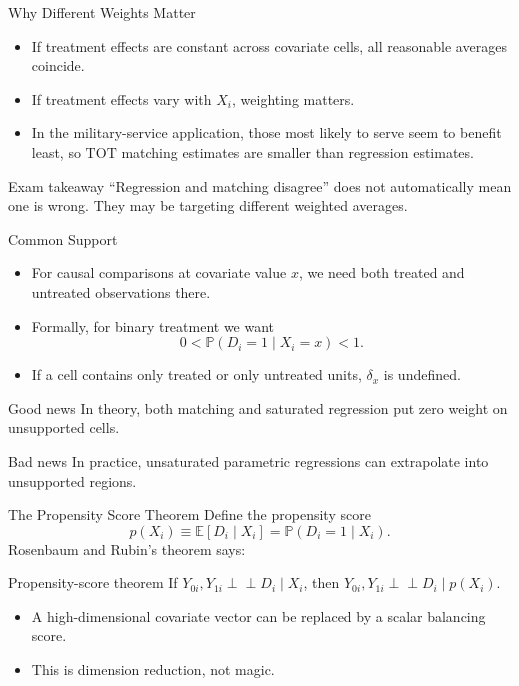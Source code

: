 \documentclass[11pt,aspectratio=169]{beamer}
\newcommand{\E}{\mathbb{E}}
\newcommand{\Prob}{\mathbb{P}}
\newcommand{\TOT}{\mathrm{TOT}}
\newcommand{\indep}{\perp\!\!\!\perp}
\newcommand{\derivbutton}[1]{\vspace{0.4em}\hfill\hyperlink{app:#1}{\beamerbutton{Appendix details}}}
\begin{document}
\begin{frame}{Why Different Weights Matter}
  \begin{itemize}
    \item If treatment effects are constant across covariate cells, all reasonable averages coincide.
    \item If treatment effects vary with \(X_i\), weighting matters.
    \item In the military-service application, those most likely to serve seem to benefit least, so \(\TOT\) matching estimates are smaller than regression estimates.
  \end{itemize}
  \begin{block}{Exam takeaway}
    ``Regression and matching disagree'' does not automatically mean one is wrong. They may be targeting different weighted averages.
  \end{block}
\end{frame}

\begin{frame}{Common Support}
  \begin{itemize}
    \item For causal comparisons at covariate value \(x\), we need both treated and untreated observations there.
    \item Formally, for binary treatment we want
    \[
      0<\Prob(D_i=1 \mid X_i=x)<1.
    \]
    \item If a cell contains only treated or only untreated units, \(\delta_x\) is undefined.
  \end{itemize}
  \begin{block}{Good news}
    In theory, both matching and saturated regression put zero weight on unsupported cells.
  \end{block}
  \begin{block}{Bad news}
    In practice, unsaturated parametric regressions can extrapolate into unsupported regions.
  \end{block}
\end{frame}

\begin{frame}{The Propensity Score Theorem}
  \hypertarget{main:pscore}{}
  Define the propensity score
  \[
    p(X_i)\equiv \E[D_i \mid X_i]=\Prob(D_i=1 \mid X_i).
  \]
  Rosenbaum and Rubin's theorem says:
  \begin{block}{Propensity-score theorem}
    If \(Y_{0i},Y_{1i}\indep D_i \mid X_i\), then \(Y_{0i},Y_{1i}\indep D_i \mid p(X_i)\).
  \end{block}
  \begin{itemize}
    \item A high-dimensional covariate vector can be replaced by a scalar balancing score.
    \item This is dimension reduction, not magic.
  \end{itemize}
  \derivbutton{pscore-proof}
\end{frame}
\end{document}
